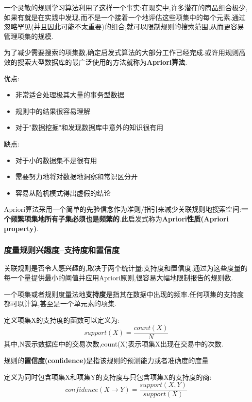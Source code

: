 \documentclass[11pt,a4paper,oneside]{book}
\begin{document}
一个灵敏的规则学习算法利用了这样一个事实:在现实中,许多潜在的商品组合极少,如果有就是在实践中发现,而不是一个接着一个地评估这些项集中的每个元素.通过忽略罕见(并且因此可能不太重要)的组合,就可以限制规则的搜索范围,从而更容易管理项集的规模.

为了减少需要搜索的项集数,确定启发式算法的大部分工作已经完成.或许用规则高效的搜索大型数据库的最广泛使用的方法就称为\textbf{Apriori算法}.

\begin{tcolorbox}[colback=pink!10!white,colframe=pink!100!black]
优点:
\begin{itemize}
	\item 非常适合处理极其大量的事务型数据
	\item 规则中的结果很容易理解
	\item 对于"数据挖掘"和发现数据库中意外的知识很有用
\end{itemize}
缺点:
\begin{itemize}
	\item 对于小的数据集不是很有用
	\item 需要努力地将对数据地洞察和常识区分开
	\item 容易从随机模式得出虚假的结论
\end{itemize}
\end{tcolorbox}

Apriori算法采用一个简单的先验信念作为准则/指引来减少关联规则地搜索空间:\textbf{一个频繁项集地所有子集必须也是频繁的}.此启发式称为\textbf{Apriori性质(Apriori property)}.

\subsubsection{度量规则兴趣度--支持度和置信度}
关联规则是否令人感兴趣的,取决于两个统计量:支持度和置信度.通过为这些度量的每一个量提供最小的阈值并应用Apriori原则,很容易大幅地限制报告的规则数.

一个项集或者规则度量法地\textbf{支持度}是指其在数据中出现的频率.任何项集的支持度都可以计算,甚至是一个单元素的项集.
\begin{tcolorbox}[colback=blue!7!white,colframe=blue!40]
定义项集X的支持度的函数可以定义为:
\begin{equation}
support(X)=\frac{count(X)}{N}
\end{equation}
其中,N表示数据库中的交易次数,count(X)表示项集X出现在交易中的次数.
\end{tcolorbox}

规则的\textbf{置信度(confidence)}是指该规则的预测能力或者准确度的度量
\begin{tcolorbox}[colback=blue!7!white,colframe=blue!40]
定义为同时包含项集X和项集Y的支持度与只包含项集X的支持度的商:
	\begin{equation}
confidence(X\rightarrow Y)=\frac{support(X,Y)}{support(X)}
	\end{equation}
\end{tcolorbox}
\end{document}
